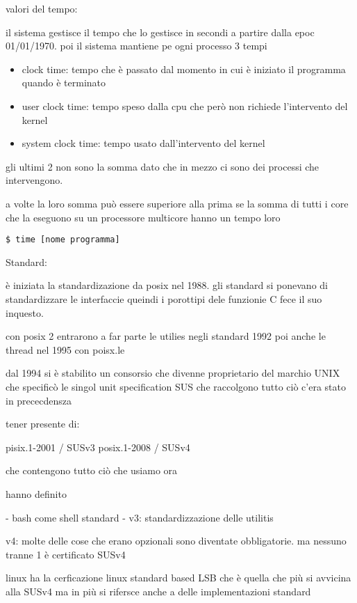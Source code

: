 valori del tempo:

il sistema gestisce il tempo che lo gestisce in secondi a partire dalla epoc 01/01/1970. poi il sistema mantiene pe ogni processo 3 tempi

\begin{itemize}
	\item clock time: tempo che è passato dal momento in cui è iniziato il programma quando è terminato
	\item user clock time: tempo speso dalla cpu che però non richiede l'intervento del kernel
	\item system clock time: tempo usato dall'intervento del kernel
\end{itemize}

gli ultimi 2 non sono la somma dato che in mezzo ci sono dei processi che intervengono.

a volte la loro somma può essere superiore alla prima se la somma di tutti i core che la eseguono su un processore multicore hanno un tempo loro

\begin{lstlisting}
$ time [nome programma]
\end{lstlisting}




Standard:

è iniziata la standardizazione da posix nel 1988. gli standard si ponevano di standardizzare le interfaccie queindi i porottipi dele funzionie C fece il suo inquesto. 

con posix 2 entrarono a far parte le utilies negli standard 1992 poi anche le thread nel 1995 con poisx.le

dal 1994 si è stabilito un consorsio che divenne proprietario del marchio UNIX che specificò le singol unit specification SUS che raccolgono tutto ciò c'era stato in prececdensza 


tener presente di:

pisix.1-2001 / SUSv3
posix.1-2008 / SUSv4

che contengono tutto ciò che usiamo ora

hanno definito

- bash come shell standard
- v3: standardizzazione delle utilitis


v4: molte delle cose che erano opzionali sono diventate obbligatorie. ma nessuno tranne 1 è certificato SUSv4

linux ha la cerficazione linux standard based LSB che è quella che più si avvicina alla SUSv4 ma in più si rifersce anche a delle implementazioni standard

